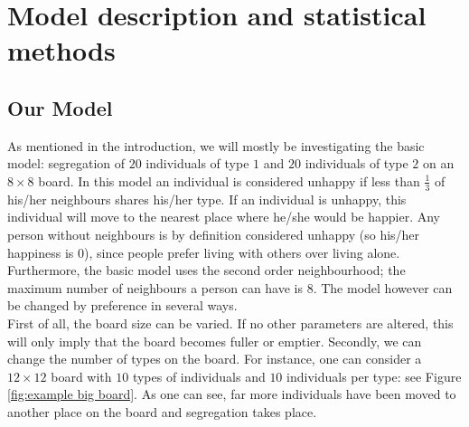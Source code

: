 \section{Model description and statistical methods}
\subsection{Our Model}
As mentioned in the introduction, we will mostly be investigating the basic model: segregation of $20$ individuals of type $1$ and $20$ individuals of type $2$ on an $8 \times 8$ board.
In this model an individual is considered unhappy if less than \(\frac{1}{3}\) of his/her neighbours shares his/her type. 
If an individual is unhappy, this individual will move to the nearest place where he/she would be happier.
Any person without neighbours is by definition considered unhappy (so his/her happiness is $0$), since people prefer living with others over living alone.
Furthermore, the basic model uses the second order neighbourhood; the maximum number of neighbours a person can have is 8. 
The model however can be changed by preference in several ways.\\

First of all, the board size can be varied.
If no other parameters are altered, this will only imply that the board becomes fuller or emptier.
Secondly, we can change the number of types on the board.
For instance, one can consider a $12\times 12$ board with $10$ types of individuals and $10$ individuals per type: see Figure \ref{fig:example big board}.
As one can see, far more individuals have been moved to another place on the board and segregation takes place.

